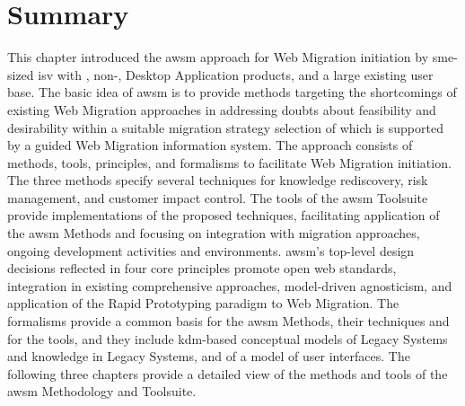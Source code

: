 \vspace{-12pt}
\section{Summary}
\vspace{13pt}

This chapter introduced the \gls{awsm} approach for \gls{Web Migration} initiation by \gls{sme}-sized \gls{isv} with , non-, \gls{Desktop Application} products, and a large existing user base.
The basic idea of \gls{awsm} is to provide methods targeting the shortcomings of existing \gls{Web Migration} approaches in addressing doubts about feasibility and desirability within a suitable migration strategy selection of which is supported by a guided \gls{Web Migration} information system.
The approach consists of methods, tools, principles, and formalisms to facilitate \gls{Web Migration} initiation.
The three methods specify several techniques for knowledge rediscovery, \gls{risk management}, and customer impact control.
The tools of the \gls{awsm} Toolsuite provide implementations of the proposed techniques, facilitating application of the \gls{awsm} Methods and focusing on integration with migration approaches, ongoing development activities and environments. 
\gls{awsm}'s top-level design decisions reflected in four core principles promote open \gls{web} standards, integration in existing comprehensive approaches, model-driven agnosticism, and application of the \gls{Rapid Prototyping} paradigm to \gls{Web Migration}.
The formalisms provide a common basis for the \gls{awsm} Methods, their techniques and for the tools, and they include \gls{kdm}-based conceptual models of \glspl{Legacy System} and knowledge in \glspl{Legacy System}, and of a model of  user interfaces.
The following three chapters provide a detailed view of the methods and tools of the \gls{awsm} Methodology and Toolsuite.